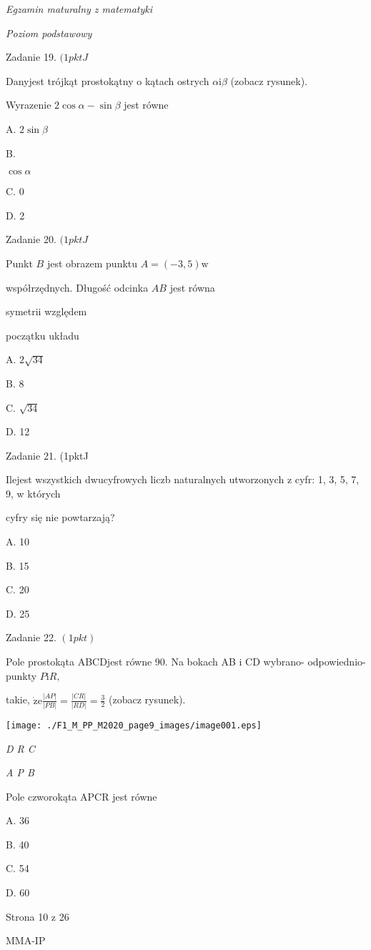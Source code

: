 \documentclass[a4paper,12pt]{article}
\begin{document}
{\it Egzamin maturalny z matematyki}

{\it Poziom podstawowy}

Zadanie 19. $(1pktJ$

Danyjest trójkąt prostokątny o kątach ostrych $\alpha \mathrm{i}\beta$ (zobacz rysunek).

Wyrazenie $ 2\cos\alpha-\sin\beta$ jest równe

A. $ 2\sin\beta$

B.

$\cos\alpha$

C. 0

D. 2

Zadanie 20. $(1pktJ$

Punkt $B$ jest obrazem punktu $A=(-3,5) \mathrm{w}$

współrzędnych. Długość odcinka $AB$ jest równa

symetrii względem

początku układu

A. $2\sqrt{34}$

B. 8

C. $\sqrt{34}$

D. 12

Zadanie 21. (1pktJ

Ilejest wszystkich dwucyfrowych liczb naturalnych utworzonych z cyfr: 1, 3, 5, 7, 9, w których

cyfry się nie powtarzają?

A. 10

B. 15

C. 20

D. 25

Zadanie 22. $(1pkt)$

Pole prostokąta ABCDjest równe 90. Na bokach AB $\mathrm{i}$ CD wybrano- odpowiednio- punkty $P\mathrm{i}R,$

takie, $\displaystyle \dot{\mathrm{z}}\mathrm{e}\frac{|AP|}{|PB|}=\frac{|CR|}{|RD|}=\frac{3}{2}$ (zobacz rysunek).
\begin{center}
\texttt{[image: ./F1\_M\_PP\_M2020\_page9\_images/image001.eps]}
\end{center}
{\it D R  C}

{\it A  P B}

Pole czworokąta APCR jest równe

A. 36

B. 40

C. 54

D. 60

Strona 10 z 26

MMA-IP
\end{document}
